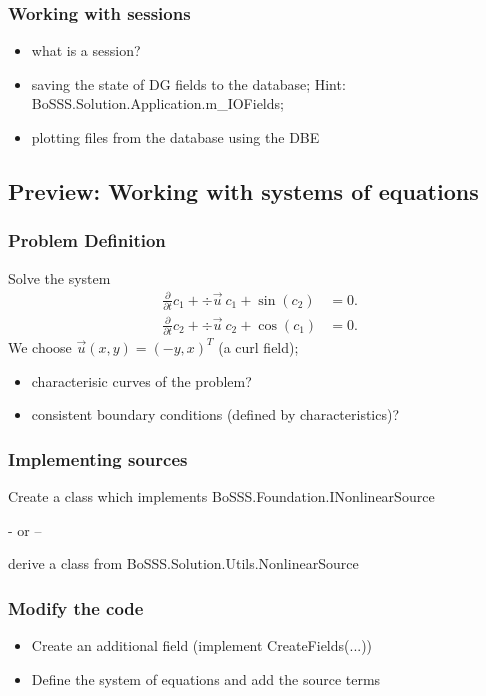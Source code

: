 \subsubsection{Working with sessions}

\begin{itemize}
  \item what is a session?
  \item saving the state of DG fields to the database;
        Hint: BoSSS.Solution.Application.m\_IOFields;
  \item plotting files from the database using the DBE
\end{itemize}

\subsection{Preview: Working with systems of equations}

\subsubsection{Problem Definition}

Solve the system
\begin{eqnarray*}
    \frac{\partial}{\partial t } c_1  +  \div{ \vec{u} \ c_1 }  +  \sin (c_2) & = 0. \\
    \frac{\partial}{\partial t } c_2  +  \div{ \vec{u} \ c_2 }  +  \cos (c_1) & = 0.
\end{eqnarray*}
We choose $\vec{u}(x,y) = (-y,x)^T$ (a curl field);
\begin{itemize}
  \item characterisic curves of the problem?
  \item consistent boundary conditions (defined by characteristics)?
\end{itemize}

\subsubsection{Implementing sources}

Create a class which implements BoSSS.Foundation.INonlinearSource

- or --

derive a class from BoSSS.Solution.Utils.NonlinearSource

\subsubsection{Modify the code}

\begin{itemize}
  \item Create an additional field (implement CreateFields(...))
  \item Define the system of equations and add the source terms
\end{itemize}


